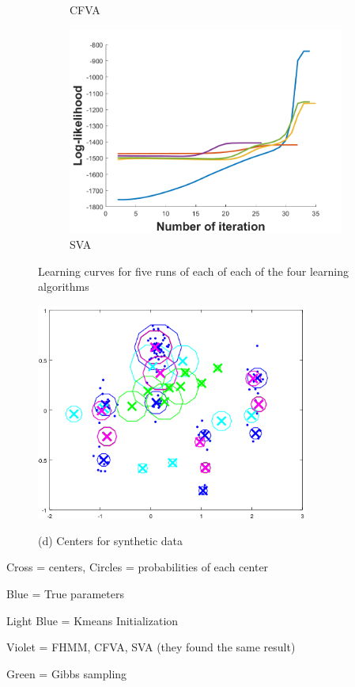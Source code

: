 \documentclass[10pt,a4paper]{report}
\begin{document}
\begin{figure}[ht]
\begin{subfigure}[b]{0.5\linewidth}
    \caption{CFVA} 
    \label{fig7:c} 
  \end{subfigure}%
  \begin{subfigure}[b]{0.5\linewidth}
    \centering
    \includegraphics[width=0.75\linewidth]{init_sva.png} 
    \caption{SVA} 
    \label{fig7:d} 
  \end{subfigure} 
  \caption{Learning curves for five runs of each of each of the four learning algorithms}
  \label{fig7} 
\end{figure}


\begin{figure}[h]
	\centering
	\includegraphics[width=0.8\textwidth]{fig11.png}
	\centerline{\Large{(d) Centers for synthetic data}}
	\label{fig:c}
\end{figure}
\begin{center}
	Cross = centers, Circles = probabilities of each center
	
	Blue = True parameters
	
	Light Blue = Kmeans Initialization
	
	Violet = FHMM, CFVA, SVA (they found the same result)
	
	Green = Gibbs sampling
	
\end{center}
\vspace{30pt}
\end{document}

